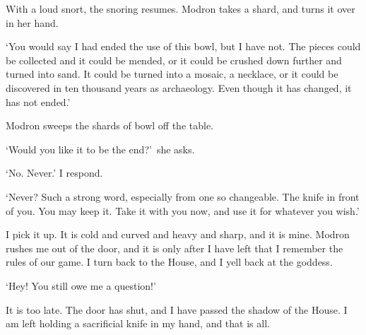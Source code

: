 With a loud snort, the snoring resumes. Modron takes a shard, and
turns it over in her hand.

`You would say I had ended the use of this bowl, but I have not. The
pieces could be collected and it could be mended, or it could be
crushed down further and turned into sand. It could be turned into a
mosaic, a necklace, or it could be discovered in ten thousand years as
archaeology. Even though it has changed, it has not ended.'

Modron sweeps the shards of bowl off the table.

`Would you like it to be the end?'~she asks.

`No. Never.' I respond.

`Never? Such a strong word, especially from one so changeable. The
knife in front of you. You may keep it. Take it with you now, and use
it for whatever you wish.'

I pick it up. It is cold and curved and heavy and sharp, and it is
mine. Modron rushes me out of the door, and it is only after I have
left that I remember the rules of our game. I turn back to the House,
and I yell back at the goddess.

`Hey! You still owe me a question!'

It is too late. The door has shut, and I have passed the shadow of the
House. I am left holding a sacrificial knife in my hand, and that is
all.


